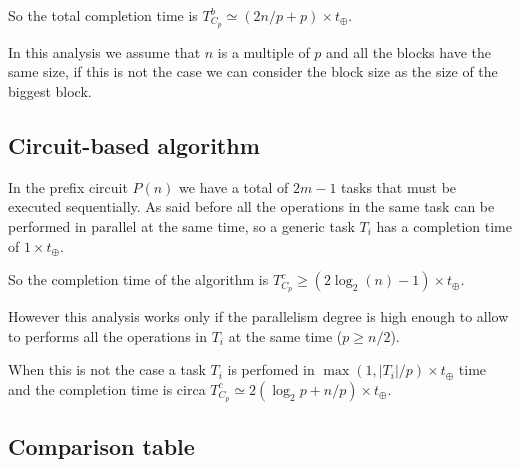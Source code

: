 \documentclass{article}
\begin{document}
So the total completion time is $T^{b}_{C_p} \simeq (2n/p + p) \times t_{\oplus}$.

\smallskip

In this analysis we assume that $n$ is a multiple of $p$ and all the blocks have the same size, if this is not the case we can consider the block size as the size of the biggest block.

\subsection{Circuit-based algorithm}

In the prefix circuit $P(n)$ we have a total of $2m-1$ tasks that must be executed sequentially. 
As said before all the operations in the same task can be performed in parallel at the same time, so a generic task $T_i$ has a completion time of $1 \times t_{\oplus}$.

So the completion time of the algorithm is $T^{c}_{C_p} \geq (2\log_{2}(n) - 1) \times t_{\oplus}$.

\smallskip

However this analysis works only if the parallelism degree is high enough to allow to performs all the operations in $T_i$ at the same time ($p \geq n/2$).

\smallskip

When this is not the case a task $T_i$ is perfomed in $\max(1, |T_i|/p) \times t_\oplus$ time and the completion time is circa $T^{c}_{C_p} \simeq 2(\log_2{p} + n/p) \times t_{\oplus}$.

\subsection{Comparison table}
\end{document}
